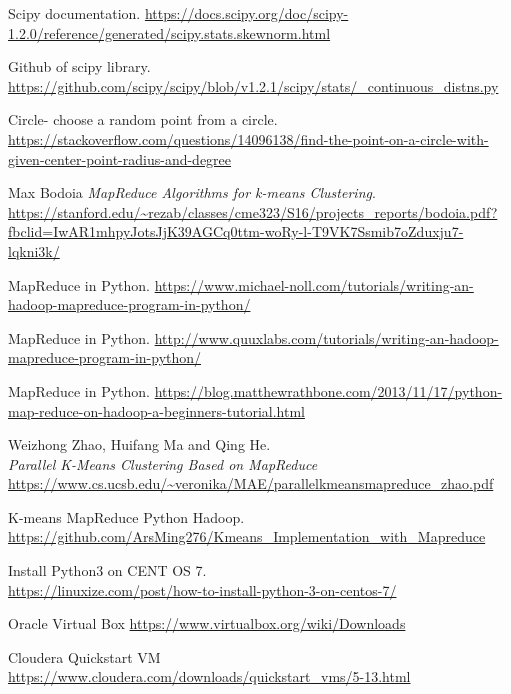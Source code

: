 \documentclass[
11pt, %
english,
singlespacing, %
headsepline, %
]{HadoopAssignment} %
\begin{document}
\renewcommand\bibname{References}
\begin{thebibliography}{9}
	
	Scipy documentation. 
	\url{https://docs.scipy.org/doc/scipy-1.2.0/reference/generated/scipy.stats.skewnorm.html}
	
	Github of scipy library.
	\url{https://github.com/scipy/scipy/blob/v1.2.1/scipy/stats/_continuous_distns.py}
	
	Circle- choose a random point from a circle.\\
	\url{https://stackoverflow.com/questions/14096138/find-the-point-on-a-circle-with-given-center-point-radius-and-degree}
	
	Max Bodoia
	\textit{MapReduce Algorithms for k-means Clustering}. 
	\url {https://stanford.edu/~rezab/classes/cme323/S16/projects_reports/bodoia.pdf?fbclid=IwAR1mhpyJotsJjK39AGCq0ttm-woRy-l-T9VK7Ssmib7oZduxju7-lqkni3k/}
	
	MapReduce in Python. 
	\url{https://www.michael-noll.com/tutorials/writing-an-hadoop-mapreduce-program-in-python/}
	
	MapReduce in Python.
	\url{http://www.quuxlabs.com/tutorials/writing-an-hadoop-mapreduce-program-in-python/}
	
	MapReduce in Python.
	\url{https://blog.matthewrathbone.com/2013/11/17/python-map-reduce-on-hadoop-a-beginners-tutorial.html}
	
	Weizhong Zhao, Huifang Ma and Qing He.\\
	\textit{Parallel K-Means Clustering Based on MapReduce}
	\url{https://www.cs.ucsb.edu/~veronika/MAE/parallelkmeansmapreduce_zhao.pdf}
	
	K-means MapReduce Python Hadoop.
	\url{https://github.com/ArsMing276/Kmeans_Implementation_with_Mapreduce}
	
	Install Python3 on CENT OS 7.\\
	\url{https://linuxize.com/post/how-to-install-python-3-on-centos-7/}
	
	Oracle Virtual Box
	\url{https://www.virtualbox.org/wiki/Downloads}
	
	Cloudera Quickstart VM
	\url{https://www.cloudera.com/downloads/quickstart_vms/5-13.html}
	
	
	
 
	
\end{thebibliography}
\end{document}
